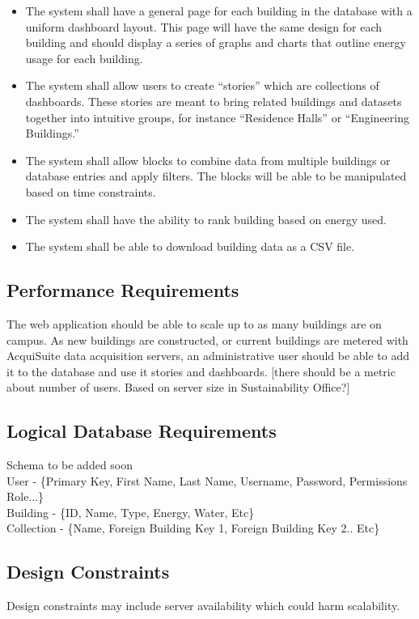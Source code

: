 \documentclass[onecolumn, draftclsnofoot,10pt, compsoc]{IEEEtran}
\begin{document}
\begin{itemize}
    \item The system shall have a general page for each building in the database with a uniform dashboard layout. This page will have the same design for each building and should display a series of graphs and charts that outline energy usage for each building.
    \item The system shall allow users to create “stories” which are collections of dashboards. These stories are meant to bring related buildings and datasets together into intuitive groups, for instance “Residence Halls” or “Engineering Buildings.”
    \item The system shall allow blocks to combine data from multiple buildings or database entries and apply filters. The blocks will be able to be manipulated based on time constraints.
    \item The system shall have the ability to rank building based on energy used.
    \item The system shall be able to download building data as a CSV file.
    \end{itemize}
    \subsection{Performance Requirements}
    
    The web application should be able to scale up to as many buildings are on campus. As new buildings are constructed, or current buildings are metered with AcquiSuite data acquisition servers, an administrative user should be able to add it to the database and use it stories and dashboards.  
    [there should be a metric about number of users. Based on server size in Sustainability Office?]
    \subsection{Logical Database Requirements}
    Schema to be added soon\\
    User - \{Primary Key, First Name, Last Name, Username, Password, Permissions Role...\} \\ 
    Building - \{ID, Name, Type, Energy, Water, Etc\}\\
    Collection - \{Name, Foreign Building Key 1, Foreign Building Key 2.. Etc\}
    
    \subsection{Design Constraints}
    Design constraints may include server availability which could harm scalability.
\end{document}
